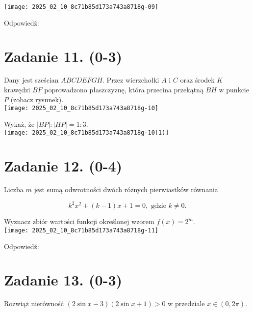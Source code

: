 \documentclass[10pt]{article}
\begin{document}
\begin{center}
\texttt{[image: 2025\_02\_10\_8c71b85d173a743a8718g-09]}
\end{center}

Odpowiedź:

\section*{Zadanie 11. (0-3)}
Dany jest sześcian \(A B C D E F G H\). Przez wierzchołki \(A\) i \(C\) oraz środek \(K\) krawędzi \(B F\) poprowadzono płaszczyznę, która przecina przekątną \(B H\) w punkcie \(P\) (zobacz rysunek).\\
\texttt{[image: 2025\_02\_10\_8c71b85d173a743a8718g-10]}

Wykaż, że \(|B P|:|H P|=1: 3\).\\
\texttt{[image: 2025\_02\_10\_8c71b85d173a743a8718g-10(1)]}

\section*{Zadanie 12. (0-4)}
Liczba \(m\) jest sumą odwrotności dwóch różnych pierwiastków równania

\[
k^{2} x^{2}+(k-1) x+1=0, \text { gdzie } k \neq 0 .
\]

Wyznacz zbiór wartości funkcji określonej wzorem \(f(x)=2^{m}\).\\
\texttt{[image: 2025\_02\_10\_8c71b85d173a743a8718g-11]}

Odpowiedź: \(\qquad\)

\section*{Zadanie 13. (0-3)}
Rozwiąż nierówność \((2 \sin x-3)(2 \sin x+1)>0\) w przedziale \(x \in(0,2 \pi)\).
\end{document}
